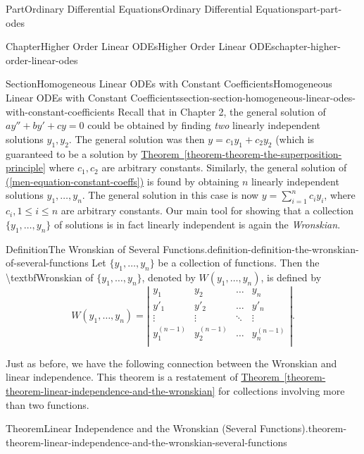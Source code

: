 \documentclass[twoside,10pt,]{book}
\newcommand{\xreffont}{\relax}
\numberwithin{equation}{part}
\newcommand{\amp}{&}
\begin{document}
\begin{partptx}{Part}{Ordinary Differential Equations}{}{Ordinary Differential Equations}{}{}{part-part-odes}
\begin{chapterptx}{Chapter}{Higher Order Linear ODEs}{}{Higher Order Linear ODEs}{}{}{chapter-higher-order-linear-odes}
\begin{sectionptx}{Section}{Homogeneous Linear ODEs with Constant Coefficients}{}{Homogeneous Linear ODEs with Constant Coefficients}{}{}{section-section-homogeneous-linear-odes-with-constant-coefficients}
Recall that in Chapter 2, the general solution of \(ay''+by'+cy=0\) could be obtained by finding \emph{two} linearly independent solutions \(y_{1},y_{2}\). The general solution was then \(y = c_{1}y_{1}+c_{2}y_{2}\) (which is guaranteed to be a solution by \hyperref[theorem-theorem-the-superposition-principle]{Theorem~{\xreffont\ref{theorem-theorem-the-superposition-principle}}} where \(c_{1},c_{2}\) are arbitrary constants. Similarly, the general solution of \hyperref[men-equation-constant-coeffs]{({\xreffont\ref{men-equation-constant-coeffs}})} is found by obtaining \(n\) linearly independent solutions \(y_{1},\dots,y_{n}\). The general solution in this case is now \(y = \sum_{i=1}^{n}c_{i}y_{i}\), where \(c_{i},1\leq i\leq n\) are arbitrary constants. Our main tool for showing that a collection \(\{y_{1},\dots,y_{n}\}\) of solutions is in fact linearly independent is again the \emph{Wronskian}.%
\begin{definition}{Definition}{The Wronskian of Several Functions.}{definition-definition-the-wronskian-of-several-functions}%
%
 Let \(\{y_{1},\dots,y_{n}\}\) be a collection of functions. Then the \textbackslash{}textbf\textbraceleft{}Wronskian\textbraceright{} of \(\{y_{1},\dots,y_{n}\}\), denoted by \(W(y_{1},\dots,y_{n})\), is defined by%
\begin{equation*}
W(y_{1},\dots,y_{n}) = \left|\begin{array}{cccc}
y_{1} \amp y_{2} \amp \dots   \amp y_{n}   \\
y'_{1}  \amp y'_{2}  \amp \dots   \amp y'_{n}  \\
\vdots  \amp \vdots  \amp \ddots  \amp \vdots  \\
y^{(n-1)}_{1} \amp y^{(n-1)}_{2} \amp \dots   \amp y^{(n-1)}_{n} \\
\end{array}\right|.
\end{equation*}
\end{definition}
Just as before, we have the following connection between the Wronskian and linear independence. This theorem is a restatement of \hyperref[theorem-theorem-linear-independence-and-the-wronskian]{Theorem~{\xreffont\ref{theorem-theorem-linear-independence-and-the-wronskian}}} for collections involving more than two functions.%
\begin{theorem}{Theorem}{Linear Independence and the Wronskian (Several Functions).}{}{theorem-theorem-linear-independence-and-the-wronskian-several-functions}%

\end{theorem}
\end{sectionptx}
\end{chapterptx}
\end{partptx}
\end{document}
